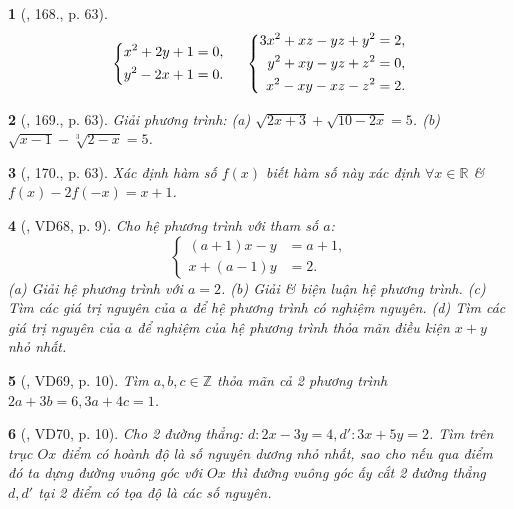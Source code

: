 \documentclass{article}
\newtheorem{baitoan}{}
\begin{document}
\begin{baitoan}[\cite{Tuyen_Toan_9_old}, 168., p. 63]
	\begin{equation*}
		\left\{\begin{split}
			x^2 + 2y + 1 &= 0,\\
			y^2 - 2x + 1 &= 0.
		\end{split}\right.\hspace{5mm}\left\{\begin{split}
			3x^2 + xz - yz + y^2 &= 2,\\
			y^2 + xy - yz + z^2 &= 0,\\
			x^2 - xy - xz - z^2 &= 2.
		\end{split}\right.
	\end{equation*}
\end{baitoan}

\begin{baitoan}[\cite{Tuyen_Toan_9_old}, 169., p. 63]
	Giải phương trình: (a) $\sqrt{2x + 3} + \sqrt{10 - 2x} = 5$. (b) $\sqrt{x - 1} - \sqrt[3]{2 - x} = 5$.
\end{baitoan}

\begin{baitoan}[\cite{Tuyen_Toan_9_old}, 170., p. 63]
	Xác định hàm số $f(x)$ biết hàm số này xác định $\forall x\in\mathbb{R}$ \& $f(x) - 2f(-x) = x + 1$.
\end{baitoan}

\begin{baitoan}[\cite{Binh_Toan_9_tap_2}, VD68, p. 9]
	Cho hệ phương trình với tham số $a$:
	\begin{equation*}
		\left\{\begin{split}
			(a + 1)x - y &= a + 1,\\
			x + (a - 1)y &= 2.
		\end{split}\right.
	\end{equation*}
	(a) Giải hệ phương trình với $a = 2$. (b) Giải \& biện luận hệ phương trình. (c) Tìm các giá trị nguyên của $a$ để hệ phương trình có nghiệm nguyên. (d) Tìm các giá trị nguyên của $a$ để nghiệm của hệ phương trình thỏa mãn điều kiện $x + y$ nhỏ nhất.
\end{baitoan}

\begin{baitoan}[\cite{Binh_Toan_9_tap_2}, VD69, p. 10]
	Tìm $a,b,c\in\mathbb{Z}$ thỏa mãn cả 2 phương trình $2a + 3b = 6,3a + 4c = 1$.
\end{baitoan}

\begin{baitoan}[\cite{Binh_Toan_9_tap_2}, VD70, p. 10]
	Cho 2 đường thẳng: $d:2x - 3y = 4,d':3x + 5y = 2$. Tìm trên trục $Ox$ điểm có hoành độ là số nguyên dương nhỏ nhất, sao cho nếu qua điểm đó ta dựng đường vuông góc với $Ox$ thì đường vuông góc ấy cắt 2 đường thẳng $d,d'$ tại 2 điểm có tọa độ là các số nguyên.
\end{baitoan}
\end{document}
